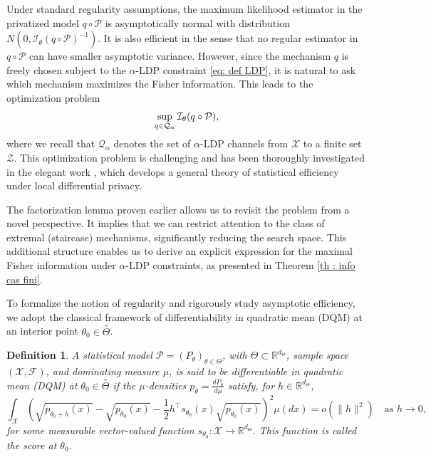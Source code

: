 \documentclass[a4paper, 11pt]{article}
\newtheorem{df}{Definition}
\theoremstyle{definition}
\newcommand{\R}{{\mathbb{R}}}
\newcommand{\cX}{{\mathcal{X}}}
\begin{document}
{Under standard regularity assumptions, the maximum likelihood estimator in the privatized model $q \circ \mathcal{P}$ is asymptotically normal with distribution $N(0, \mathcal{I}_\theta(q \circ \mathcal{P})^{-1})$. It is also efficient in the sense that no regular estimator in $q \circ \mathcal{P}$ can have smaller asymptotic variance. However, since the mechanism $q$ is freely chosen subject to the $\alpha$-LDP constraint \eqref{eq: def LDP}, it is natural to ask which mechanism maximizes the Fisher information. This leads to the optimization problem
\begin{equation}{\label{eq: opt Fisher}}
\sup_{q \in \mathcal{Q}_\alpha} \mathcal{I}_\theta(q \circ \mathcal{P}),
\end{equation}
where we recall that $\mathcal{Q}_\alpha$ denotes the set of $\alpha$-LDP channels from $\mathcal{X}$ to a finite set $\mathcal{Z}$.
This optimization problem is challenging and has been thoroughly investigated in the elegant work \cite{steinbergerEfficiencyLocalDifferent}, which develops a general theory of statistical efficiency under local differential privacy.

The factorization lemma proven earlier allows us to revisit the problem from a novel perspective. It implies that we can restrict attention to the class of extremal (staircase) mechanisms, significantly reducing the search space. This additional structure enables us to derive an explicit expression for the maximal Fisher information under $\alpha$-LDP constraints, as presented in Theorem \ref{th : info cas fini}.

To formalize the notion of regularity and rigorously study asymptotic efficiency, we adopt the classical framework of differentiability in quadratic mean (DQM) at an interior point $\theta_0 \in \overset{\circ}{\Theta}$.

\begin{df}\label{def: DQM}
A statistical model $\mathcal{P} = (P_\theta)_{\theta \in \Theta}$, with $\Theta \subset \R^{d_\Theta}$, sample space $(\mathcal{X}, \mathcal{F})$, and dominating measure $\mu$, is said to be \textit{differentiable in quadratic mean (DQM) at $\theta_0 \in \overset{\circ}{\Theta}$} if the $\mu$-densities $p_\theta = \frac{dP_\theta}{d\mu}$ satisfy, for $h \in \mathbb{R}^{d_\Theta}$,
$$
\int_\cX \left(\sqrt{p_{\theta_0+h}(x)} - \sqrt{p_{\theta_0}(x)} - \frac{1}{2} h^{\top}s_{\theta_0}(x) \sqrt{p_{\theta_0}(x)} \right)^2 \mu(dx) = o(\|h\|^2)
\quad \text{as } h \to 0,
$$
for some measurable vector-valued function $s_{\theta_0} : \cX \to \mathbb{R}^{d_\Theta}$. This function is called the score at $\theta_0$.
\end{df}

}
\end{document}
